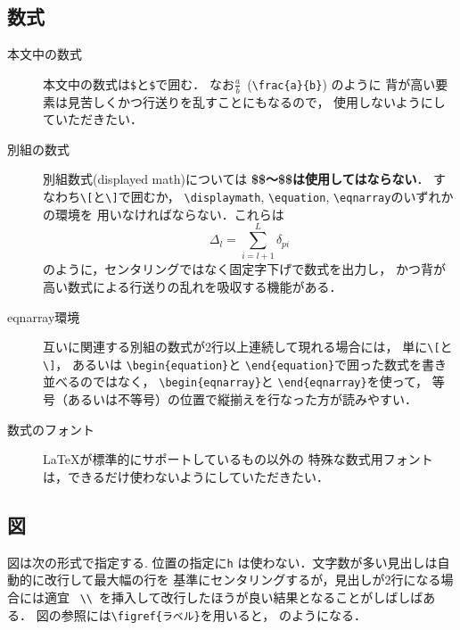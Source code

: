\documentclass[a4j, 9pt, twocolumn, twoside]{jsarticle}
\begin{document}
\subsection{数式}
\begin{description}
\item[本文中の数式]{
本文中の数式は\texttt{\$}と\texttt{\$}で囲む．
なお$\frac{a}{b}$~(\texttt{\textbackslash frac\{a\}\{b\}}) のように
背が高い要素は見苦しくかつ行送りを乱すことにもなるので，
使用しないようにしていただきたい．}
\item[別組の数式]{別組数式(displayed math)については
\textbf{\$\$〜\$\$は使用してはならない}．
すなわち\verb+\[+と\verb+\]+で囲むか，
\texttt{\textbackslash displaymath}, \texttt{\textbackslash equation}, 
\texttt{\textbackslash eqnarray}のいずれかの環境を
用いなければならない．これらは
\begin{equation}
\Delta_l = \sum_{i=l+1}^L\delta_{pi}
\end{equation}
のように，センタリングではなく固定字下げで数式を出力し，
かつ背が高い数式による行送りの乱れを吸収する機能がある．}
\item[eqnarray環境]{
互いに関連する別組の数式が2行以上連続して現れる場合には，
単に\verb+\[+と\verb+\]+，
あるいは \texttt{\textbackslash begin\{equation\}}と
\texttt{\textbackslash end\{equation\}}で囲った数式を書き並べるのではなく，
\texttt{\textbackslash begin\{eqnarray\}}と
\texttt{\textbackslash end\{eqnarray\}}を使って，
等号（あるいは不等号）の位置で縦揃えを行なった方が読みやすい．}
\item[数式のフォント]{\LaTeX が標準的にサポートしているもの以外の
特殊な数式用フォントは，できるだけ使わないようにしていただきたい．}
\end{description}

\subsection{図}
図は次の形式で指定する. 位置の指定に\texttt{h}
は使わない．文字数が多い見出しは自動的に改行して最大幅の行を
基準にセンタリングするが，見出しが2行になる場合には適宜
~\verb+\\+~を挿入して改行したほうが良い結果となることがしばしばある．
図の参照には\texttt{\textbackslash figref\{ラベル\}}を用いると，
のようになる．
\end{document}
